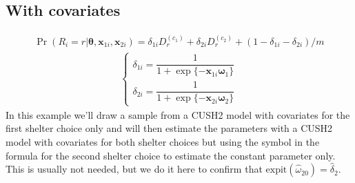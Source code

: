 \documentclass[letterpaper,10pt,english]{sphinxmanual}
\begin{document}
\subsection{With covariates}
\label{\detokenize{manual:id157}}\begin{equation*}
\begin{split}\Pr(R_i=r|\pmb\theta,\pmb x_{1i}, \pmb x_{2i}) = \delta_{1i} D_r^{(c_1)} + \delta_{2i} D_r^{(c_2)} + (1-\delta_{1i}- \delta_{2i})/m\end{split}
\end{equation*}\begin{equation*}
\begin{split}\left\{
\begin{array}{l}
    \delta_{1i} = \dfrac{1}{1+\exp\{ - \pmb x_{1i} \pmb\omega_1 \}}
    \\
    \delta_{2i} = \dfrac{1}{1+\exp\{ - \pmb x_{2i} \pmb\omega_2 \}}
\end{array}
\right.\end{split}
\end{equation*}
\sphinxAtStartPar
In this example we’ll draw a sample from a CUSH2 model with
covariates for the first shelter choice only and will then
estimate the parameters with a CUSH2 model with covariates
for both shelter choices but using the symbol  in the
formula for the second shelter choice to estimate the
constant parameter only. This is usually not needed, but
we do it here to confirm that \(\mathrm{expit}(\hat\omega_{20})=\hat\delta_2\).
\def\sphinxLiteralBlockLabel{\label{\detokenize{manual:id179}}}
\end{document}
